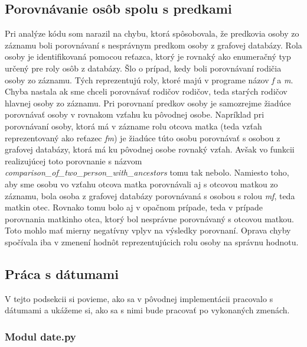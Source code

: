 \subsection{Porovnávanie osôb spolu s predkami}

Pri analýze kódu som narazil na chybu, ktorá spôsobovala, že predkovia osoby zo záznamu boli porovnávaní s nesprávnym predkom osoby z grafovej databázy. Rola osoby je identifikovaná pomocou reťazca, ktorý je rovnaký ako enumeračný typ určený pre roly osôb z databázy. Šlo o prípad, kedy boli porovnávaní rodičia osoby zo záznamu. Tých reprezentujú roly, ktoré majú v programe názov \textit{f} a \textit{m}. Chyba nastala ak sme chceli porovnávať rodičov rodičov, teda starých rodičov hlavnej osoby zo záznamu. Pri porovnaní predkov osoby je samozrejme žiadúce porovnávať osoby v rovnakom vzťahu ku pôvodnej osobe. Napríklad pri porovnávaní osoby, ktorá má v zázname rolu otcova matka (teda vzťah reprezentovaný ako reťazec \textit{f\textunderscore m}) je žiadúce túto osobu porovnávať s osobou z grafovej databázy, ktorá má ku pôvodnej osobe rovnaký vzťah. Avšak vo funkcii realizujúcej toto porovnanie s názvom \textit{comparison\_of\_two\_person\_with\_ancestors} tomu tak nebolo. Namiesto toho, aby sme osobu vo vzťahu otcova matka porovnávali aj s otcovou matkou zo záznamu, bola osoba z grafovej databázy porovnávaná s osobou s rolou \textit{m\textunderscore f}, teda matkin otec. Rovnako tomu bolo aj v opačnom prípade, teda v prípade porovnania matkinho otca, ktorý bol nesprávne porovnávaný s otcovou matkou. Toto mohlo mať mierny negatívny vplyv na výsledky porovnaní. Oprava chyby spočívala iba v zmenení hodnôt reprezentujúcich rolu osoby na správnu hodnotu.

\subsection{Práca s dátumami}

V tejto podsekcii si povieme, ako sa v pôvodnej implementácii pracovalo s dátumami a ukážeme si, ako sa s nimi bude pracovať po vykonaných zmenách.

\subsubsection{Modul date.py}

